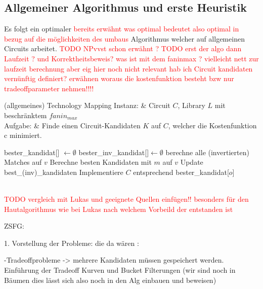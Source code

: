 \documentclass[11pt, a4paper, german]{article}
\begin{document}
 \subsection{Allgemeiner Algorithmus und erste Heuristik}
 Es folgt ein optimaler \textcolor{red}{bereits erwähnt was optimal bedeutet also optimal in bezug auf die möglichkeiten des umbaus} Algorithmus welcher auf allgemeinen Circuits arbeitet. 
 \textcolor{red}{TODO NPvvst schon erwähnt ? TODO erst der algo dann Laufzeit ? und Korrektheitsbeweis? was ist mit dem faninmax ? vielleicht nett zur laufzeit berechnung aber eig hier noch nicht relevant  hab ich Circuit kandidaten vernünftig definiert? erwähnen woraus die kostenfunktion besteht bzw nur tradeoffparameter nehmen!!!!}\\
 
 \begin{problem}[framed]{(allgemeines) Technology Mapping}
  Instanz:  & Circuit $C$, Library $L$ mit beschr\"anktem $fanin_{max}$\\
  Aufgabe: &  Finde einen Circuit-Kandidaten $K$ auf $C$, welcher die Kostenfunktion c minimiert.
\end{problem}

\begin{algorithm}[H]
 \LinesNumbered
 \DontPrintSemicolon
 \caption{(allgemeines) Technology Mapping}

 bester\_kandidat[] $\gets \emptyset$\;
 bester\_inv\_kandidat[]$ \gets \emptyset$\;
 {
   berechne alle (invertierten) Matches auf $v$\;
   {
      Berechne besten Kandidaten mit $m$ auf $v$\;
      Update best\_(inv)\_kandidaten\;
   }
 }
 Implementiere $C$ entsprechend bester\_kandidat[$o$]\;
\end{algorithm}\ \\
 
 
 
 \textcolor{red}{ TODO vergleich mit Lukas und geeignete Quellen einfügen!! besonders für den Hautalgorithmus wie bei Lukas nach welchem Vorbeild der entstanden ist}


\newpage

ZSFG:

1. Vorstellung der Probleme: die da wären :

	-Tradeoffprobleme -> mehrere Kandidaten müssen gespeichert werden. Einführung der Tradeoff Kurven und Bucket Filterungen (wir sind noch in Bäumen dies lässt sich also noch in den Alg einbauen und beweisen) 
	
\end{document}
